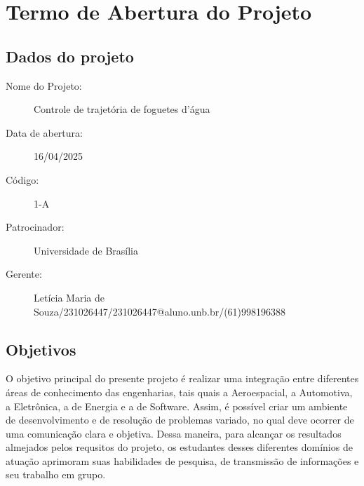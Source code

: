 \chapter{Termo de Abertura do Projeto}
\section{Dados do projeto}
\begin{description}
    \item [Nome do Projeto:] Controle de trajetória de foguetes d'água 
    \item [Data de abertura:] 16/04/2025
    \item [Código:] 1-A
    \item [Patrocinador:] Universidade de Brasília
    \item [Gerente:] Letícia Maria de Souza/231026447/231026447@aluno.unb.br/(61)998196388
\end{description}

\section{Objetivos}
O objetivo principal do presente projeto é realizar uma integração entre diferentes áreas de conhecimento das engenharias, tais quais a Aeroespacial, a Automotiva, a Eletrônica, a de Energia e a de Software. Assim, é possível criar um ambiente de desenvolvimento e de resolução de problemas variado, no qual deve ocorrer de uma comunicação clara e objetiva. Dessa maneira, para alcançar os resultados almejados pelos requsitos do projeto, os estudantes desses diferentes domínios de atuação aprimoram suas habilidades de pesquisa, de transmissão de informações e seu trabalho em grupo.

